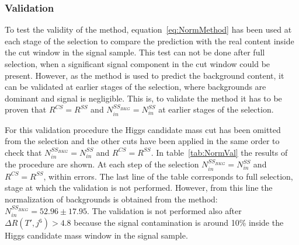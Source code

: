 \subsubsection{Validation}
\label{sec:normval}

To test the validity of the method, equation~\ref{eq:NormMethod} has been used at each stage of the selection to compare the prediction with the real content inside the cut window in the signal sample. This test can not be done after full selection, when a significant signal component in the cut window could be present. However, as the method is used to predict the background content, it can be validated at earlier stages of the selection, where backgrounds are dominant and signal is negligible. This is, to validate the method it has to be proven that $R^{CS}=R^{SS}$ and $N^{SS_{BKG}}_{in}=N^{SS}_{in}$ at earlier stages of the selection.

For this validation procedure the Higgs candidate mass cut has been omitted from the selection and the other cuts have been applied in the same order to check that $N^{SS_{BKG}}_{in}=N^{SS}_{in}$ and $R^{CS}=R^{SS}$. In table~\ref{tab:NormVal} the results of the procedure are shown. At each step of the selection $N^{SS_{BKG}}_{in}=N^{SS}_{in}$ and $R^{CS}=R^{SS}$, within errors. The last line of the table corresponds to full selection, stage at which the validation is not performed. However, from this line the normalization of backgrounds is obtained from the method: $N^{SS_{BKG}}_{in}=52.96\pm17.95$. The validation is not performed also after $ \Delta R (T',j^{6})>4.8$ because the signal contamination is around 10\% inside the Higgs candidate mass window in the signal sample.

